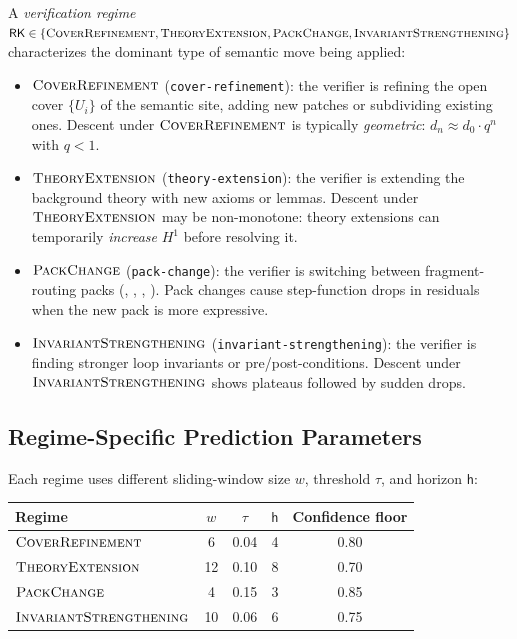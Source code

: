 \documentclass[11pt]{article}
\newcommand{\Horizon}{\mathsf{h}}           %
\newcommand{\RegimeK}{\mathsf{RK}}          %
\newcommand{\RKcov}{\textsc{CoverRefinement}}
\newcommand{\RKtheo}{\textsc{TheoryExtension}}
\newcommand{\RKpack}{\textsc{PackChange}}
\newcommand{\RKinv}{\textsc{InvariantStrengthening}}
\newcommand{\HOne}{H^1}                     %
\newcommand{\Thresh}{\tau}                  %
\newcommand{\WindowSize}{w}                 %
\begin{document}
\begin{definition}\label{def:regime}
A \emph{verification regime} $\RegimeK \in \{\RKcov, \RKtheo, \RKpack,
\RKinv\}$ characterizes the dominant type of semantic move being applied:
\begin{itemize}
  \item $\RKcov$ (\texttt{cover-refinement}): the verifier is refining
        the open cover $\{U_i\}$ of the semantic site, adding new
        patches or subdividing existing ones.  Descent under
        $\RKcov$ is typically \emph{geometric}: $d_n \approx d_0 \cdot q^n$
        with $q < 1$.
  \item $\RKtheo$ (\texttt{theory-extension}): the verifier is extending
        the background theory with new axioms or lemmas.  Descent under
        $\RKtheo$ may be non-monotone: theory extensions can temporarily
        \emph{increase} $\HOne$ before resolving it.
  \item $\RKpack$ (\texttt{pack-change}): the verifier is switching
        between fragment-routing packs (\QFLIA, \QFLRA, \QFBV, \QFUF).
        Pack changes cause step-function drops in residuals when the new
        pack is more expressive.
  \item $\RKinv$ (\texttt{invariant-strengthening}): the verifier is
        finding stronger loop invariants or pre/post-conditions.
        Descent under $\RKinv$ shows plateaus followed by sudden drops.
\end{itemize}
\end{definition}

\subsection{Regime-Specific Prediction Parameters}

Each regime uses different sliding-window size $\WindowSize$, threshold
$\Thresh$, and horizon $\Horizon$:

\begin{center}
\begin{tabular}{lcccc}
\toprule
Regime & $\WindowSize$ & $\Thresh$ & $\Horizon$ & Confidence floor \\
\midrule
$\RKcov$  & 6  & 0.04 & 4 & 0.80 \\
$\RKtheo$ & 12 & 0.10 & 8 & 0.70 \\
$\RKpack$ & 4  & 0.15 & 3 & 0.85 \\
$\RKinv$  & 10 & 0.06 & 6 & 0.75 \\
\bottomrule
\end{tabular}
\end{center}
\end{document}
